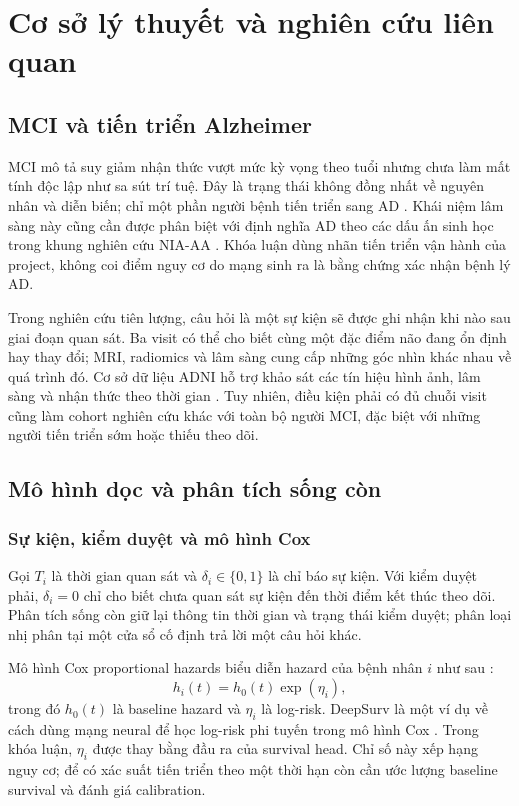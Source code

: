 \chapter{Cơ sở lý thuyết và nghiên cứu liên quan}
\label{chap:background}

\section{MCI và tiến triển Alzheimer}
MCI mô tả suy giảm nhận thức vượt mức kỳ vọng theo tuổi nhưng chưa làm mất tính độc lập như sa sút trí tuệ. Đây là trạng thái không đồng nhất về nguyên nhân và diễn biến; chỉ một phần người bệnh tiến triển sang AD \cite{petersen2018mci}. Khái niệm lâm sàng này cũng cần được phân biệt với định nghĩa AD theo các dấu ấn sinh học trong khung nghiên cứu NIA-AA \cite{jack2018niaaa}. Khóa luận dùng nhãn tiến triển vận hành của project, không coi điểm nguy cơ do mạng sinh ra là bằng chứng xác nhận bệnh lý AD.

Trong nghiên cứu tiên lượng, câu hỏi là một sự kiện sẽ được ghi nhận khi nào sau giai đoạn quan sát. Ba visit có thể cho biết cùng một đặc điểm não đang ổn định hay thay đổi; MRI, radiomics và lâm sàng cung cấp những góc nhìn khác nhau về quá trình đó. Cơ sở dữ liệu ADNI hỗ trợ khảo sát các tín hiệu hình ảnh, lâm sàng và nhận thức theo thời gian \cite{weiner2015impact}. Tuy nhiên, điều kiện phải có đủ chuỗi visit cũng làm cohort nghiên cứu khác với toàn bộ người MCI, đặc biệt với những người tiến triển sớm hoặc thiếu theo dõi.

\section{Mô hình dọc và phân tích sống còn}
\subsection{Sự kiện, kiểm duyệt và mô hình Cox}
Gọi $T_i$ là thời gian quan sát và $\delta_i\in\{0,1\}$ là chỉ báo sự kiện. Với kiểm duyệt phải, $\delta_i=0$ chỉ cho biết chưa quan sát sự kiện đến thời điểm kết thúc theo dõi. Phân tích sống còn giữ lại thông tin thời gian và trạng thái kiểm duyệt; phân loại nhị phân tại một cửa sổ cố định trả lời một câu hỏi khác.

Mô hình Cox proportional hazards biểu diễn hazard của bệnh nhân $i$ như sau \cite{cox1972regression}:
\begin{equation}
 h_i(t)=h_0(t)\exp(\eta_i),
\end{equation}
trong đó $h_0(t)$ là baseline hazard và $\eta_i$ là log-risk. DeepSurv là một ví dụ về cách dùng mạng neural để học log-risk phi tuyến trong mô hình Cox \cite{katzman2018deepsurv}. Trong khóa luận, $\eta_i$ được thay bằng đầu ra của survival head. Chỉ số này xếp hạng nguy cơ; để có xác suất tiến triển theo một thời hạn còn cần ước lượng baseline survival và đánh giá calibration.

